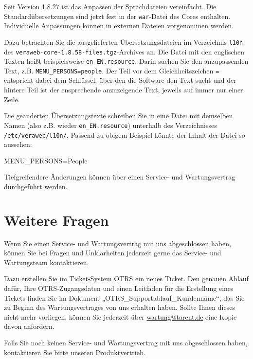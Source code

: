 \documentclass{tarentanleitung}
\newcommand{\vwiaverssw}{1.8.58}
\begin{document}
Seit Version 1.8.27 ist das Anpassen der Sprachdateien vereinfacht.
Die Standardübersetzungen sind jetzt fest in der \texttt{war}-Datei
des Cores enthalten. Individuelle Anpassungen können in
externen Dateien vorgenommen werden.

Dazu betrachten Sie die ausgelieferten Übersetzungsdateien im Verzeichnis
\texttt{l10n} des \texttt{veraweb-core-\vwiaverssw{}-files.tgz}-Archives
an. Die Datei mit den englischen Texten heißt beispielsweise
\texttt{en\_EN.resource}. Darin suchen Sie den anzupassenden Text,
z.B. \texttt{MENU\_PERSONS=people}. Der Teil vor dem Gleichheitszeichen
\texttt{=} entspricht dabei dem Schlüssel, über den die Software den
Text sucht und der hintere Teil ist der ensprechende anzuzeigende Text,
jeweils auf immer nur einer Zeile.

Die geänderten Übersetzungstexte schreiben Sie in eine Datei mit demselben
Namen (also z.B. wieder \texttt{en\_EN.resource}) unterhalb des Verzeichnisses
\texttt{/etc/veraweb/l10n/}. Passend zu obigem Beispiel könnte der Inhalt der
Datei so aussehen:\keinumbruch

\begin{minipage}{\linewidth}
\begin{lstdumpx}
MENU_PERSONS=People
\end{lstdumpx}
\end{minipage}

Tiefgreifendere Änderungen können über einen Service- und Wartungsvertrag
durchgeführt werden.

\section{Weitere Fragen}\label{sec:outro}

Wenn Sie einen Service- und Wartungsvertrag mit uns abgeschlossen
haben, können Sie bei Fragen und Unklarheiten jederzeit gerne das
Service- und Wartungsteam kontaktieren.

Dazu erstellen Sie im Ticket-System OTRS ein neues Ticket. Den
genauen Ablauf dafür, Ihre OTRS-Zugangsdaten und einen Leitfaden
für die Erstellung eines Tickets finden Sie im Dokument
„OTRS\_Supportablauf\_Kundenname“, das Sie zu Beginn des
Wartungsvertrages von uns erhalten haben. Sollte Ihnen dieses
nicht mehr vorliegen, können Sie jederzeit über
\href{mailto:wartung@tarent.de}{wartung@tarent.de} eine Kopie
davon anfordern.

Falls Sie noch keinen Service- und Wartungsvertrag mit uns abgeschlossen
haben, kontaktieren Sie bitte unseren Produktvertrieb.
\end{document}
